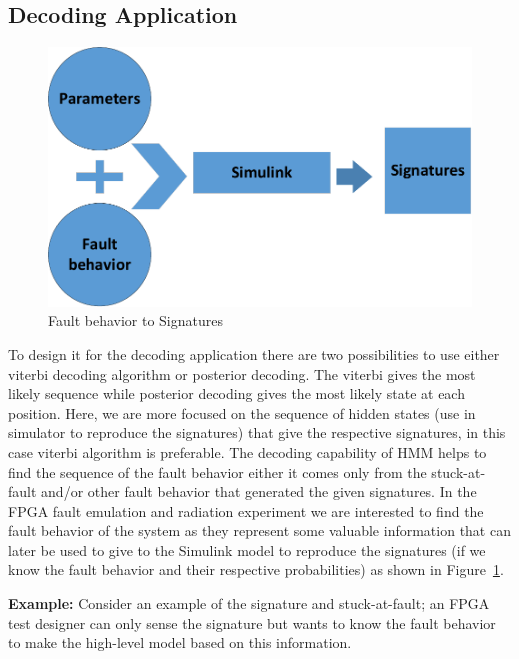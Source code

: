 \subsection{Decoding Application}


\begin{figure}[tb!]

 \centering
  \captionsetup{justification=centering}    
   \includegraphics[scale=0.8]{Figures/fromhiddentosignature.pdf}
   \caption{Fault behavior to Signatures}
\label{fig:HMMsig}
\end{figure}


To design it for the decoding application there are two possibilities to use either viterbi decoding algorithm or posterior decoding. The viterbi gives the most likely sequence while posterior decoding gives the most likely state at each position. Here, we are more focused on the sequence of hidden states (use in simulator to reproduce the signatures) that give the respective signatures, in this case viterbi algorithm is preferable. The decoding capability of HMM helps to find the sequence of the fault behavior either it comes only from the stuck-at-fault and/or other fault behavior that generated the given signatures. In the FPGA fault emulation and radiation experiment we are interested to find the fault behavior of the system as they represent some valuable information that can later be used to give to the Simulink model to reproduce the signatures (if we know the fault behavior and their respective probabilities) as shown in Figure~\ref{fig:HMMsig}.




 
\textbf{Example:} Consider an example of the signature and stuck-at-fault; an FPGA test designer can only sense the signature but wants to know the fault behavior to make the high-level model based on this information.

